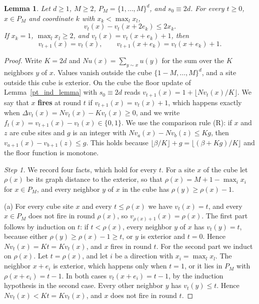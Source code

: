 \documentclass[12pt]{amsart}
\newtheorem{lemma}[theorem]{Lemma}
\begin{document}
\begin{lemma}\label{lem:strict-head-facet}
Let $d\geq1$, $M\geq2$, $P_M=\{1,\ldots,M\}^d$, and $s_0\equiv2d$.
For every $t\geq0$, $x\in P_M$ and coordinate $k$ with $x_k<\max_l x_l$,
\[
v_t(x)-v_t(x+2e_k)\leq2x_k.
\]
If $x_k=1$, $\max_l x_l\geq2$, and $v_t(x)=v_t(x+e_k)+1$, then
\[
v_{t+1}(x)=v_t(x),\qquad v_{t+1}(x+e_k)=v_t(x+e_k)+1.
\]
\end{lemma}
\begin{proof}
Write $K=2d$ and $Nu(x)=\sum_{y\sim x}u(y)$ for the sum over the $K$ neighbors $y$ of $x$. Values vanish outside the cube $\{1-M,\ldots,M\}^d$, and a site outside this cube is exterior. On the cube the floor update of Lemma~\ref{pt_ind_lemma} with $s_0\equiv 2d$ reads $v_{t+1}(x)=1+\lfloor Nv_t(x)/K\rfloor$. We say that $x$ \textbf{fires} at round $t$ if $v_{t+1}(x)=v_t(x)+1$, which happens exactly when $\Delta v_t(x)=Nv_t(x)-Kv_t(x)\geq0$, and we write $f_t(x)=v_{t+1}(x)-v_t(x)\in\{0,1\}$. We use the comparison rule (R): if $x$ and $z$ are cube sites and $g$ is an integer with $Nv_a(x)-Nv_b(z)\leq Kg$, then $v_{a+1}(x)-v_{b+1}(z)\leq g$. This holds because $\lfloor \beta/K\rfloor+g=\lfloor(\beta+Kg)/K\rfloor$ and the floor function is monotone.

\emph{Step 1.} We record four facts, which hold for every $t$. For a site $x$ of the cube let $\rho(x)$ be its graph distance to the exterior, so that $\rho(x)=M+1-\max_i x_i$ for $x\in P_M$, and every neighbor $y$ of $x$ in the cube has $\rho(y)\geq\rho(x)-1$.

(a) For every cube site $x$ and every $t\leq\rho(x)$ we have $v_t(x)=t$, and every $x\in P_M$ does not fire in round $\rho(x)$, so $v_{\rho(x)+1}(x)=\rho(x)$. The first part follows by induction on $t$: if $t<\rho(x)$, every neighbor $y$ of $x$ has $v_t(y)=t$, because either $\rho(y)\geq\rho(x)-1\geq t$, or $y$ is exterior and $t=0$. Hence $Nv_t(x)=Kt=Kv_t(x)$, and $x$ fires in round $t$. For the second part we induct on $\rho(x)$. Let $t=\rho(x)$, and let $i$ be a direction with $x_i=\max_l x_l$. The neighbor $x+e_i$ is exterior, which happens only when $t=1$, or it lies in $P_M$ with $\rho(x+e_i)=t-1$. In both cases $v_t(x+e_i)=t-1$, by the induction hypothesis in the second case. Every other neighbor $y$ has $v_t(y)\leq t$. Hence $Nv_t(x)<Kt=Kv_t(x)$, and $x$ does not fire in round $t$.


\end{proof}
\end{document}
